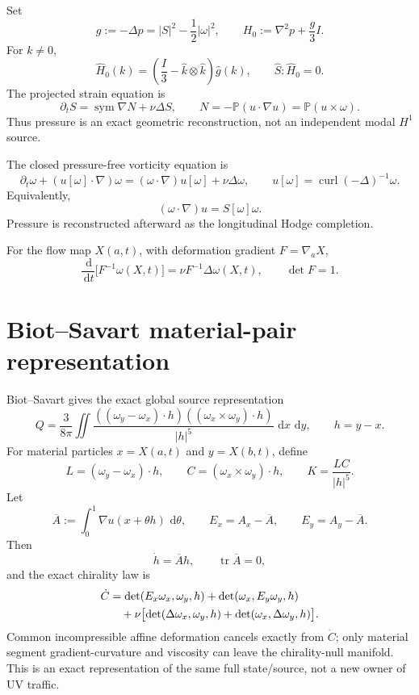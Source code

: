 \documentclass[11pt]{article}
\newcommand{\dd}{\,\mathrm d}
\newcommand{\curl}{\operatorname{curl}}
\newcommand{\sym}{\operatorname{sym}}
\newcommand{\tr}{\operatorname{tr}}
\begin{document}
Set
\[
g:=-\Delta p=|S|^2-\frac12|\omega|^2,
\qquad
H_0:=\nabla^2p+\frac g3I.
\]
For $k\ne0$,
\[
\widehat H_0(k)
=\left(\frac I3-\widehat k\otimes\widehat k\right)\widehat g(k),
\qquad
\widehat S:\widehat H_0=0.
\]
The projected strain equation is
\[
\partial_tS=\sym\nabla N+\nu\Delta S,
\qquad
N=-\mathbb P(u\cdot\nabla u)=\mathbb P(u\times\omega).
\]
Thus pressure is an exact geometric reconstruction, not an independent modal $H^1$ source.

The closed pressure-free vorticity equation is
\begin{equation}\label{eq:vorticity}
\boxed{
\partial_t\omega+(u[\omega]\cdot\nabla)\omega
=(\omega\cdot\nabla)u[\omega]+\nu\Delta\omega,
\qquad
u[\omega]=\curl(-\Delta)^{-1}\omega.
}
\end{equation}
Equivalently,
\[
(\omega\cdot\nabla)u=S[\omega]\omega.
\]
Pressure is reconstructed afterward as the longitudinal Hodge completion.

For the flow map $X(a,t)$, with deformation gradient $F=\nabla_aX$,
\begin{equation}\label{eq:Cauchydefect}
\boxed{
\frac{\dd}{\dd t}
\bigl[F^{-1}\omega(X,t)\bigr]
=\nu F^{-1}\Delta\omega(X,t),
\qquad
\det F=1.
}
\end{equation}

\section{Biot--Savart material-pair representation}

Biot--Savart gives the exact global source representation
\begin{equation}\label{eq:BSQ}
\boxed{
Q
=\frac{3}{8\pi}
\iint
\frac{((\omega_y-\omega_x)\cdot h)
((\omega_x\times\omega_y)\cdot h)}{|h|^5}
\,\dd x\,\dd y,
\qquad h=y-x.
}
\end{equation}
For material particles $x=X(a,t)$ and $y=X(b,t)$, define
\begin{equation}\label{eq:LCk}
L=(\omega_y-\omega_x)\cdot h,
\qquad
C=(\omega_x\times\omega_y)\cdot h,
\qquad
K=\frac{LC}{|h|^5}.
\end{equation}
Let
\[
\overline A
:=\int_0^1\nabla u(x+\theta h)\,\dd\theta,
\qquad
E_x=A_x-\overline A,
\qquad
E_y=A_y-\overline A.
\]
Then
\[
\dot h=\overline A h,
\qquad
\tr\overline A=0,
\]
and the exact chirality law is
\begin{align}
\dot C
&=\det(E_x\omega_x,\omega_y,h)
+\det(\omega_x,E_y\omega_y,h)\notag\\
&\quad
+\nu\bigl[
\det(\Delta\omega_x,\omega_y,h)
+\det(\omega_x,\Delta\omega_y,h)
\bigr].
\label{eq:Cdot}
\end{align}
Common incompressible affine deformation cancels exactly from $\dot C$; only material segment gradient-curvature and viscosity can leave the chirality-null manifold.  This is an exact representation of the same full state/source, not a new owner of UV traffic.
\end{document}
